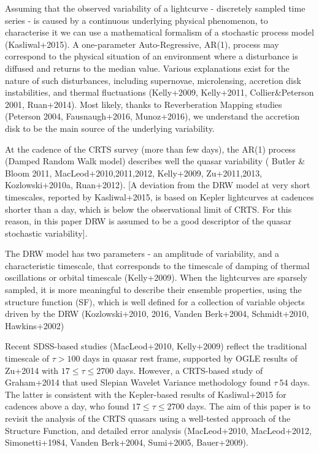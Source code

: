 \documentclass[a4paper,fleqn,usenatbib]{mnras}
\begin{document}
Assuming that the observed  variability of a lightcurve -   discretely sampled time series -  is caused by a continuous underlying physical phenomenon, to characterise it we can use a mathematical formalism of a stochastic process model (Kasliwal+2015). A one-parameter Auto-Regressive, AR(1), process  may correspond to the physical situation of an environment where a disturbance is diffused and returns to the median value. Various explanations exist for the nature of such disturbances,  including supernovae, microlensing, accretion disk instabilities, and thermal fluctuations  (Kelly+2009, Kelly+2011, Collier\&Peterson 2001, Ruan+2014).  Most likely, thanks to  Reverberation Mapping studies (Peterson 2004, Fausnaugh+2016,  Munoz+2016), we understand the accretion disk to be  the main source of the underlying variability. 

At the cadence of the CRTS survey (more than few days), the AR(1) process (Damped Random Walk model) describes well the quasar variability ( Butler & Bloom 2011, MacLeod+2010,2011,2012, Kelly+2009, Zu+2011,2013, Kozlowski+2010a, Ruan+2012).  [A deviation from the DRW model at very short timescales, reported by Kasliwal+2015, is based on Kepler lightcurves at cadences shorter than a day, which is below the observational limit of CRTS. For this reason, in this paper DRW is assumed to be a good descriptor of the quasar stochastic variability].
 
The DRW model has two parameters - an amplitude of variability, and a characteristic timescale, that corresponds to the timescale of damping of thermal oscillations or orbital timescale (Kelly+2009).   When the lightcurves are sparsely sampled,  it is more meaningful to describe their ensemble properties,  using the structure function (SF), which is  well defined for a collection of variable objects driven by the DRW (Kozlowski+2010, 2016, Vanden Berk+2004, Schmidt+2010, Hawkins+2002)

 Recent SDSS-based studies (MacLeod+2010, Kelly+2009) reflect the traditional timescale of $\tau > 100 $ days in quasar rest frame, supported by OGLE results of Zu+2014 with $ 17 \leq \tau \leq 2700 $ days. However, a CRTS-based study of Graham+2014 that used Slepian Wavelet Variance methodology found $\tau ~ 54$ days. The latter is consistent with the Kepler-based results of Kasliwal+2015 for cadences above a day, who found   $ 17 \leq \tau \leq 2700 $ days.  The aim of this paper is to revisit the analysis of the CRTS quasars using a  well-tested approach of the Structure Function, and detailed error analysis (MacLeod+2010, MacLeod+2012, Simonetti+1984, Vanden Berk+2004, Sumi+2005, Bauer+2009). 
 
\end{document}
